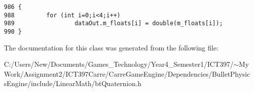 \begin{Code}\begin{verbatim}986 {
988         for (int i=0;i<4;i++)
989                 dataOut.m_floats[i] = double(m_floats[i]);
990 }
\end{verbatim}
\end{Code}




The documentation for this class was generated from the following file:\begin{CompactItemize}
\item 
C:/Users/New/Documents/Games\_\-Technology/Year4\_\-Semester1/ICT397/$\sim$My Work/Assignment2/ICT397Carre/CarreGameEngine/Dependencies/BulletPhysicsEngine/include/LinearMath/btQuaternion.h\end{CompactItemize}
